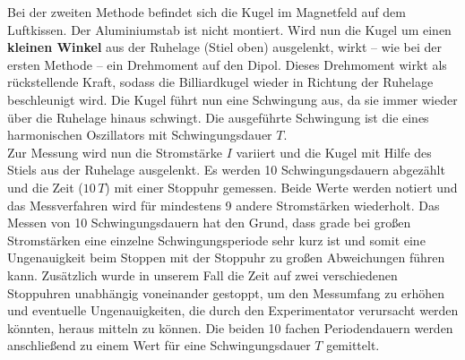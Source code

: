 Bei der zweiten Methode befindet sich die Kugel im Magnetfeld auf dem Luftkissen. Der Aluminiumstab ist nicht montiert. Wird nun die Kugel um einen \textbf{kleinen Winkel}
aus der Ruhelage (Stiel oben) ausgelenkt, wirkt -- wie bei der ersten Methode -- ein Drehmoment auf den Dipol. Dieses Drehmoment wirkt als rückstellende Kraft,
sodass die Billiardkugel wieder in Richtung der Ruhelage beschleunigt wird. Die Kugel führt nun eine Schwingung aus, da sie immer wieder über die Ruhelage hinaus schwingt.
Die ausgeführte Schwingung ist die eines harmonischen Oszillators mit Schwingungsdauer $T$. \\
Zur Messung wird nun die Stromstärke $I$ variiert und die Kugel mit Hilfe des Stiels aus der Ruhelage ausgelenkt. Es werden 10 Schwingungsdauern abgezählt und die Zeit ($10 \,T$) 
mit einer Stoppuhr gemessen. Beide Werte werden notiert und das Messverfahren wird für mindestens 9 andere Stromstärken wiederholt.
Das Messen von 10 Schwingungsdauern hat den Grund, dass grade bei großen Stromstärken eine einzelne Schwingungsperiode sehr kurz ist und somit eine Ungenauigkeit beim Stoppen
mit der Stoppuhr zu großen Abweichungen führen kann. Zusätzlich wurde in unserem Fall die Zeit auf zwei verschiedenen Stoppuhren unabhängig voneinander gestoppt, um den 
Messumfang zu erhöhen und eventuelle Ungenauigkeiten, die durch den Experimentator verursacht werden könnten, heraus mitteln zu können.
Die beiden 10 fachen Periodendauern werden anschließend zu einem Wert für eine Schwingungsdauer $T$ gemittelt.
 